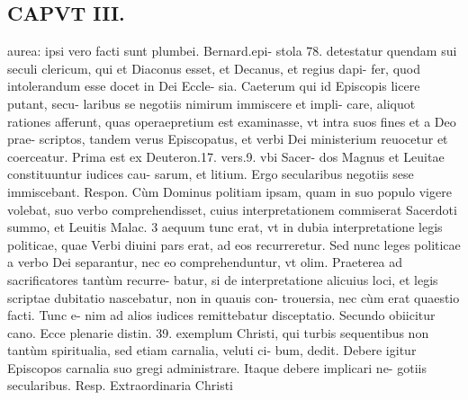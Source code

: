 \documentclass{article}
\begin{document}
\begin{pages}
\section*{CAPVT  III. }
\marginpar{[ p.152 ]}\pstart aurea: ipsi vero facti sunt plumbei. Bernard.epi- stola 78. detestatur quendam sui seculi clericum, qui et Diaconus esset, et Decanus, et regius dapi- fer, quod intolerandum esse docet in Dei Eccle- sia.  \pend\pstart Caeterum qui id Episcopis licere putant, secu- laribus se negotiis nimirum immiscere et impli- care, aliquot rationes afferunt, quas operaepretium est examinasse, vt intra suos fines et a Deo prae- scriptos, tandem verus Episcopatus, et verbi Dei ministerium reuocetur et coerceatur.  \pend\pstart Prima est ex Deuteron.17. vers.9. vbi Sacer- dos Magnus et Leuitae constituuntur iudices cau- sarum, et litium. Ergo secularibus negotiis sese immiscebant. Respon. Cùm Dominus politiam ipsam, quam in suo populo vigere volebat, suo verbo comprehendisset, cuius interpretationem commiserat Sacerdoti summo, et Leuitis Malac. 3 aequum tunc erat, vt in dubia interpretatione legis politicae, quae Verbi diuini pars erat, ad eos recurreretur. Sed nunc leges politicae a verbo Dei separantur, nec eo comprehenduntur, vt olim. Praeterea ad sacrificatores tantùm recurre- batur, si de interpretatione alicuius loci, et legis scriptae dubitatio nascebatur, non in quauis con- trouersia, nec cùm erat quaestio facti. Tunc e- nim ad alios iudices remittebatur disceptatio.  \pend\pstart Secundo obiicitur cano. Ecce plenarie distin. 39. exemplum Christi, qui turbis sequentibus non tantùm spiritualia, sed etiam carnalia, veluti ci- bum, dedit. Debere igitur Episcopos carnalia suo gregi administrare. Itaque debere implicari ne- gotiis secularibus. Resp. Extraordinaria Christi  \pend

\end{pages}
\end{document}
